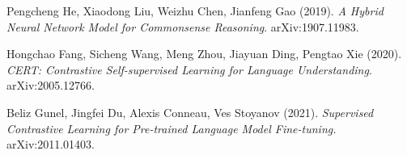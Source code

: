 \documentclass{article}
\begin{document}
\begin{thebibliography}{9}
Pengcheng He, Xiaodong Liu, Weizhu Chen, Jianfeng Gao (2019). \emph{A Hybrid Neural Network Model for Commonsense Reasoning}. arXiv:1907.11983. 

Hongchao Fang, Sicheng Wang, Meng Zhou, Jiayuan Ding, Pengtao Xie (2020). \emph{CERT: Contrastive Self-supervised Learning for Language Understanding}. 	arXiv:2005.12766.

Beliz Gunel, Jingfei Du, Alexis Conneau, Ves Stoyanov (2021). \emph{Supervised Contrastive Learning for
Pre-trained Language Model Fine-tuning.} 	arXiv:2011.01403. 
\end{thebibliography}
\newpage
\end{document}
